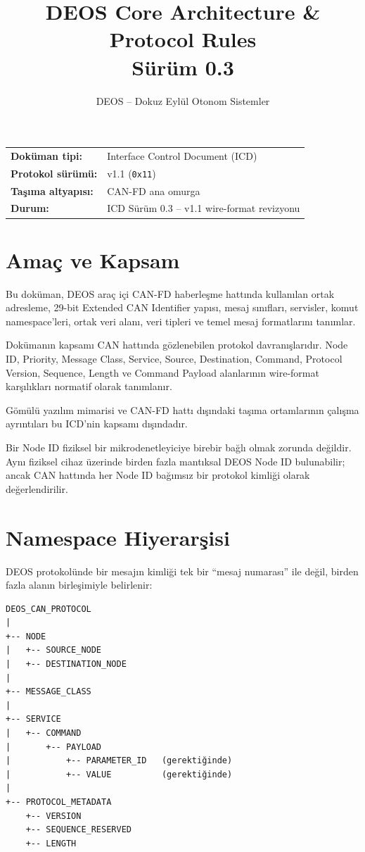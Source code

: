 \documentclass[a4paper,10pt]{article}
\title{\textbf{DEOS Core Architecture \& Protocol Rules}\\
\large Sürüm 0.3}
\author{DEOS -- Dokuz Eylül Otonom Sistemler}
\date{}
\newcommand{\hex}[1]{\texttt{0x#1}}
\begin{document}
\maketitle

\begin{center}
\begin{tabular}{ll}
\textbf{Doküman tipi:} & Interface Control Document (ICD) \\
\textbf{Protokol sürümü:} & v1.1 (\hex{11}) \\
\textbf{Taşıma altyapısı:} & CAN-FD ana omurga \\
\textbf{Durum:} & ICD Sürüm 0.3 -- v1.1 wire-format revizyonu \\
\end{tabular}
\end{center}


\section{Amaç ve Kapsam}

Bu doküman, DEOS araç içi CAN-FD haberleşme hattında kullanılan ortak adresleme,
29-bit Extended CAN Identifier yapısı, mesaj sınıfları, servisler, komut namespace'leri,
ortak veri alanı, veri tipleri ve temel mesaj formatlarını tanımlar.

Dokümanın kapsamı CAN hattında gözlenebilen protokol davranışlarıdır. Node ID, Priority,
Message Class, Service, Source, Destination, Command, Protocol Version, Sequence, Length ve
Command Payload alanlarının wire-format karşılıkları normatif olarak tanımlanır.

Gömülü yazılım mimarisi ve CAN-FD hattı dışındaki taşıma ortamlarının çalışma ayrıntıları
bu ICD'nin kapsamı dışındadır.

Bir Node ID fiziksel bir mikrodenetleyiciye birebir bağlı olmak zorunda değildir. Aynı
fiziksel cihaz üzerinde birden fazla mantıksal DEOS Node ID bulunabilir; ancak CAN hattında
her Node ID bağımsız bir protokol kimliği olarak değerlendirilir.

\section{Namespace Hiyerarşisi}

DEOS protokolünde bir mesajın kimliği tek bir ``mesaj numarası'' ile değil, birden fazla
alanın birleşimiyle belirlenir:

\begin{verbatim}
DEOS_CAN_PROTOCOL
|
+-- NODE
|   +-- SOURCE_NODE
|   +-- DESTINATION_NODE
|
+-- MESSAGE_CLASS
|
+-- SERVICE
|   +-- COMMAND
|       +-- PAYLOAD
|           +-- PARAMETER_ID   (gerektiğinde)
|           +-- VALUE          (gerektiğinde)
|
+-- PROTOCOL_METADATA
    +-- VERSION
    +-- SEQUENCE_RESERVED
    +-- LENGTH
\end{verbatim}
\end{document}
